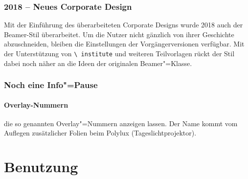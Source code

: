 \begin{frame}
  \frametitle{2018 – Neues Corporate Design} Mit der Einführung des
  überarbeiteten Corporate Designs wurde 2018 auch der Beamer-Stil
  überarbeitet. Um die Nutzer nicht gänzlich von ihrer Geschichte
  abzuschneiden, bleiben die Einstellungen der Vorgängerversionen
  verfügbar. Mit der Unterstützung von \texttt{\textbackslash
    institute} und weiteren Teilvorlagen rückt der Stil dabei noch
  näher an die Ideen der originalen Beamer"=Klasse.
\end{frame}
\begin{frame}\frametitle{Noch eine Info"=Pause}
  \framesubtitle{Overlay-Nummern}

  die so genannten \alert<6>{Overlay}"=Nummern anzeigen lassen. Der
  Name kommt vom Auflegen zusätzlicher Folien beim Polylux
  (Tageslichtprojektor).
\end{frame}

\section{Benutzung}

